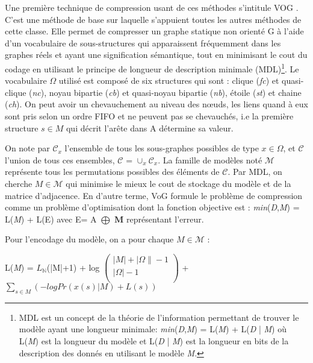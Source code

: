 
Une première technique de compression usant de ces méthodes s'intitule VOG \citep{koutra2015summarizing}. C'est une méthode de base sur laquelle s'appuient toutes les autres méthodes de cette classe. Elle permet de compresser un graphe statique non orienté G à l'aide d'un vocabulaire de sous-structures qui apparaissent fréquemment dans les graphes réels et ayant  une signification sémantique, tout en minimisant le cout du codage en utilisant le principe de longueur de description minimale (MDL)\footnote{MDL est un concept de la théorie de l'information permettant de trouver le modèle ayant une longueur minimale: \textit{min}(\textit{D},\textit{M}) = L(\textit{M}) + L(\textit{D} | \textit{M}) où L(\textit{M}) est la longueur du modèle et L(\textit{D} | \textit{M}) est la longueur en bits de la description des donnés en utilisant le modèle \textit{M}.}. 
Le vocabulaire $\Omega$ utilisé est composé de six structures qui sont : clique (\textit{fc}) et quasi-clique (\textit{nc}), noyau bipartie (\textit{cb}) et quasi-noyau bipartie (\textit{nb}), étoile (\textit{st}) et chaine (\textit{ch}). On peut avoir un chevauchement au niveau des nœuds, les liens quand à eux sont pris selon un ordre FIFO et ne peuvent pas se chevauchés, i.e la première structure $ s \in \textit{M} $ qui décrit l'arête dans A détermine sa valeur.

On note par $\mathcal{C}_{x}$ l'ensemble de tous les sous-graphes possibles de type $x \in \Omega$, et $\mathcal{C}$ l'union de tous ces ensembles, $\mathcal{C}$ = ${\cup}_{x}\mathcal{C}_{x}$. La famille de modèles noté $\mathcal{M}$ représente tous les permutations possibles des éléments de $\mathcal{C}$. Par MDL, on cherche $\textit{M} \in \mathcal{M}$ qui minimise le mieux le cout de stockage du modèle et de la matrice d'adjacence.
En d'autre terme, VoG formule le problème de compression comme un problème d'optimisation dont la fonction objective est :
 \textit{min}(\textit{D},\textit{M}) = L(\textit{M}) + L(E) avec E= A $\bigoplus$ $\mathbf{M} $ représentant l'erreur. 

Pour l'encodage du modèle, on a pour chaque $\textit{M} \in  \mathcal{M}$ : 

\begin{center}
L(\textit{M}) = $L_{\mathbb{N}}$(|M|+1) + log $\left( \begin{array}{c}
|\textit{M}| + |\Omega\| -1 \\
|\Omega| -1 \\
\end{array} \right)$ + $\sum\limits_{s  \in \textit{M}} ( - log Pr(x(s)  |  \textit{M} ) + L(s) )$\\
\end{center}

